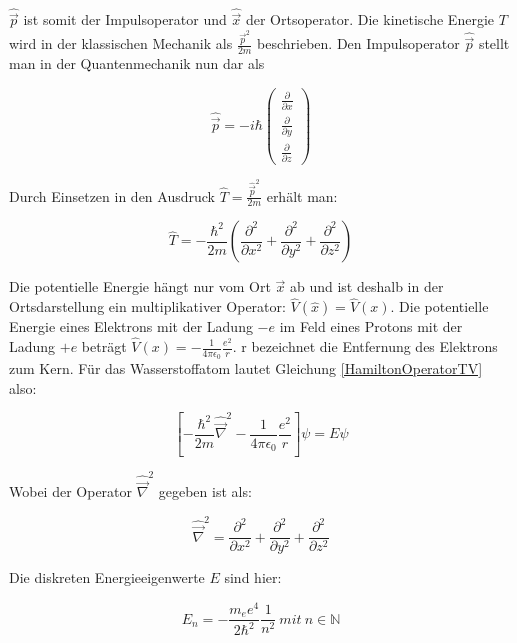 $\hat{\vec{p}}$ ist somit der Impulsoperator und $\hat{\vec{x}}$ der Ortsoperator. Die kinetische Energie $T$ wird in der klassischen Mechanik als $\frac{\vec{p}^2}{2m}$ beschrieben. Den Impulsoperator $\hat{\vec{p}}$ stellt man in der Quantenmechanik nun dar als 

\begin{equation}
\hat{\vec{p}} = -i\hbar \left( 
\begin{array}{c}
\frac{\partial}{\partial x} \\ \frac{\partial}{\partial y} \\ \frac{\partial}{\partial z}
\end{array} \right)
\end{equation}

Durch Einsetzen in den Ausdruck $\hat{T}=\frac{\hat{\vec{p}}^2}{2m}$ erhält man:

\begin{equation}
\hat{T}=-\frac{\hbar^2}{2m}  \left( \frac{\partial ^2}{\partial  x^2}+\frac{\partial ^2}{\partial  y^2}+\frac{\partial ^2}{\partial  z^2}\right)
\end{equation}

Die potentielle Energie hängt nur vom Ort $\vec{x}$ ab und ist deshalb in der Ortsdarstellung ein multiplikativer Operator: $\hat{V}(\hat{x})=\hat{V}(x)$. Die potentielle Energie eines Elektrons mit der Ladung $-e$ im Feld eines Protons mit der Ladung $+e$ beträgt $\hat{V}(x) = -\frac{1}{4 \pi \epsilon_0}\frac{e^2}{r}$. r bezeichnet die Entfernung des Elektrons zum Kern. Für das Wasserstoffatom lautet Gleichung \ref{HamiltonOperatorTV} also:

\begin{equation}
\left[ - \frac{\hbar^2}{2m}  \hat{\vec{\nabla}}^2 -\frac{1}{4 \pi \epsilon_0}\frac{e^2}{r} \right] \psi = E\psi
\end{equation}

Wobei der Operator $\hat{\vec{\nabla}}^2$ gegeben ist als:

\begin{equation}
\hat{\vec{\nabla}}^2 = \frac{\partial ^2}{\partial  x^2}+\frac{\partial ^2}{\partial  y^2}+\frac{\partial ^2}{\partial  z^2}
\end{equation}

Die diskreten Energieeigenwerte $E$ sind hier:

\begin{equation}
E_n=-\frac{m_e e^4}{2\hbar^2}\frac{1}{n^2} \:mit \: n\in \mathbb{N}
\end{equation}
